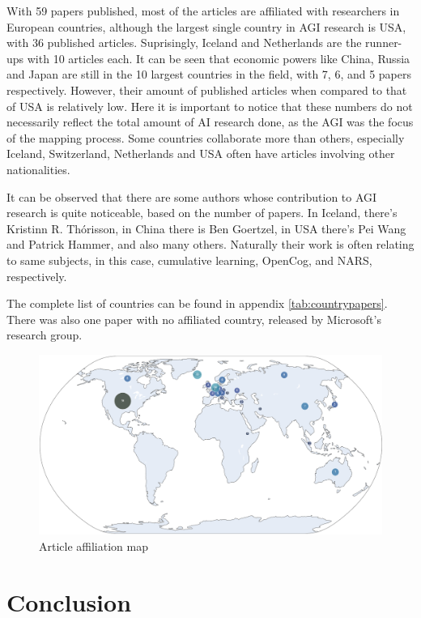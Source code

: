 \documentclass[utf8,english]{gradu3}
\begin{document}
With 59 papers published, most of the articles are affiliated with researchers
in European countries, although the largest single country in AGI research is
USA, with 36 published articles. Suprisingly, Iceland and Netherlands are the
runner-ups with 10 articles each. It can be seen that economic powers like
China, Russia and Japan are still in the 10 largest countries in the field, with
7, 6, and 5 papers respectively. However, their amount of published articles
when compared to that of USA is relatively low. Here it is important to notice
that these numbers do not necessarily reflect the total amount of AI research
done, as the AGI was the focus of the mapping process. Some countries
collaborate more than others, especially Iceland, Switzerland, Netherlands and
USA often have articles involving other nationalities.

It can be observed that there are some authors whose contribution to AGI
research is quite noticeable, based on the number of papers. In Iceland, there's
Kristinn R. Th\'orisson, in China there is Ben Goertzel, in USA there's Pei Wang
and Patrick Hammer, and also many others. Naturally their work is often relating
to same subjects, in this case, cumulative learning, OpenCog, and NARS,
respectively.

The complete list of countries can be found in
appendix \ref*{tab:countrypapers}. There was also one paper with no affiliated
country, released by Microsoft's research group.

\begin{figure}
  \includegraphics[scale=0.60]{material/data/research_map_delta_count.png}
  \caption{Article affiliation map}
  \label{fig:researchmap}
\end{figure}

\chapter{Conclusion}
\label{chap:conclusion}
\end{document}
